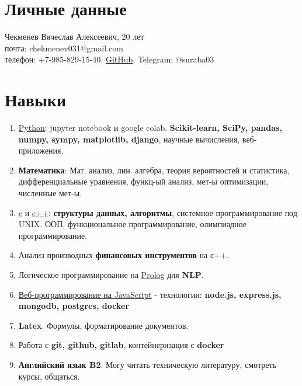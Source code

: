 \documentclass[a4paper,10pt]{report}
\date{}
\begin{document}
\section{Личные данные}
      \large Чекменев Вячеслав Алексеевич, 20 лет\\
      \large почта: chekmenev031@gmail.com \\
      \large телефон: +7-985-829-15-40, \href{https://github.com/Suraba03}{GitHub}, Telegram: @suraba03\\
\section{Навыки}
\begin{enumerate}
    \item \underline{Python}: jupyter notebook и google colab. \textbf{Scikit-learn, SciPy, pandas, numpy, sympy, matplotlib, django}, научные вычисления, веб-приложения.
    \item \textbf{Математика}: Мат. анализ, лин. алгебра, теория вероятностей и статистика, дифференциальные уравнения, функц-ый анализ, мет-ы оптимизации, численные мет-ы.
    \item \underline{c} и \underline{c++}: \textbf{структуры данных, алгоритмы}, системное программирование под UNIX. ООП, функциональное программирование, олимпиадное программирование. 
    \item Анализ производных \textbf{финансовых инструментов} на с++.
    \item Логическое программирование на \underline{Prolog} для \textbf{NLP}.
    \item \underline{Веб-программирование на JavaScript} - технологии: \textbf{node.js, express.js, mongodb, postgres, docker}
    \item \textbf{Latex}. Формулы, форматирование документов.
    \item Работа с \textbf{git, github, gitlab}, контейнеризация с \textbf{docker}
    \item \textbf{Английский язык B2}. Могу читать техническую литературу, смотреть курсы, общаться.
\end{enumerate}
\end{document}
